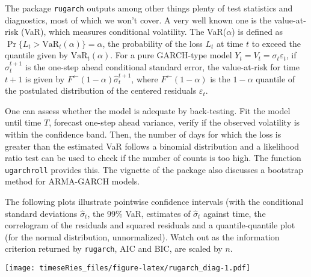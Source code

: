 \documentclass[]{book}
\newenvironment{Shaded}{\begin{snugshade}}{\end{snugshade}}
\newcommand{\CommentTok}[1]{\textcolor[rgb]{0.56,0.35,0.01}{\textit{#1}}}
\newcommand{\DataTypeTok}[1]{\textcolor[rgb]{0.13,0.29,0.53}{#1}}
\newcommand{\DecValTok}[1]{\textcolor[rgb]{0.00,0.00,0.81}{#1}}
\newcommand{\KeywordTok}[1]{\textcolor[rgb]{0.13,0.29,0.53}{\textbf{#1}}}
\newcommand{\NormalTok}[1]{#1}
\begin{document}
The package \texttt{rugarch} outputs among other things plenty of test
statistics and diagnostics, most of which we won't cover. A very well
known one is the value-at-risk (VaR), which measures conditional
volatility. The VaR(\(\alpha\)) is defined as
\(\Pr\{L_{t}>\mathrm{VaR}_t(\alpha)\}=\alpha\), the probability of the
loss \(L_t\) at time \(t\) to exceed the quantile given by
\(\mathrm{VaR}_t(\alpha)\). For a pure GARCH-type model
\(Y_t=V_t=\sigma_t\varepsilon_t\), if \(\hat{\sigma}_t^{t+1}\) is the
one-step ahead conditional standard error, the value-at-risk for time
\(t+1\) is given by \(F^{\leftarrow}(1-\alpha)\hat{\sigma}_t^{t+1}\),
where \(F^{\leftarrow}(1-\alpha)\) is the \(1-\alpha\) quantile of the
postulated distribution of the centered residuals \(\varepsilon_t\).

One can assess whether the model is adequate by back-testing. Fit the
model until time \(T\), forecast one-step ahead variance, verify if the
observed volatility is within the confidence band. Then, the number of
days for which the loss is greater than the estimated VaR follows a
binomial distribution and a likelihood ratio test can be used to check
if the number of counts is too high. The function \texttt{ugarchroll}
provides this. The vignette of the package also discusses a bootstrap
method for ARMA-GARCH models.

The following plots illustrate pointwise confidence intervals (with the
conditional standard deviations \(\hat{\sigma}_t\), the 99\% VaR,
estimates of \(\hat{\sigma}_t\) against time, the correlogram of the
residuals and squared residuals and a quantile-quantile plot (for the
normal distribution, unnormalized). Watch out as the information
criterion returned by \texttt{rugarch}, AIC and BIC, are scaled by
\(n\).

\begin{Shaded}
\end{Shaded}

\texttt{[image: timeseRies\_files/figure-latex/rugarch\_diag-1.pdf]}

\begin{Shaded}
\end{Shaded}
\end{document}
